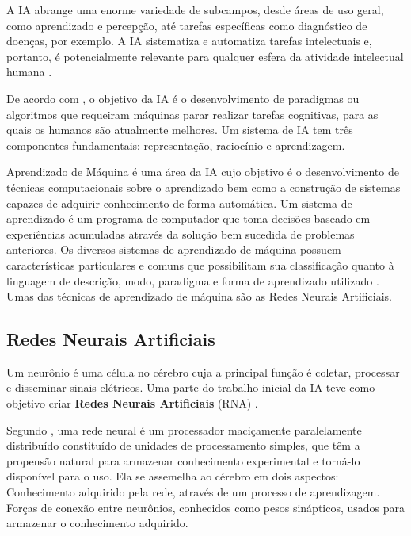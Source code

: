 \documentclass[
	12pt,				%
	openright,			%
	oneside,
	a4paper,			%
	english,			%
	french,				%
	spanish,			%
	brazil,				%
	]{abntex2}
\begin{document}
A IA abrange uma enorme variedade de subcampos, desde áreas de uso geral, como aprendizado e percepção, até tarefas específicas como diagnóstico de doenças, por exemplo. A IA sistematiza e automatiza tarefas intelectuais e, portanto, é potencialmente relevante para qualquer esfera da atividade intelectual humana \cite{russell2004inteligencia}.

De acordo com , o objetivo da IA é o desenvolvimento de paradigmas ou algoritmos que requeiram máquinas parar realizar tarefas cognitivas, para as quais os humanos são atualmente melhores. Um sistema de IA tem três componentes fundamentais: representação, raciocínio e aprendizagem.

Aprendizado de Máquina é uma área da IA cujo objetivo é o desenvolvimento de técnicas computacionais sobre o aprendizado bem como a construção de sistemas capazes de adquirir conhecimento de forma automática. Um sistema de aprendizado é um programa de computador que toma decisões baseado em experiências acumuladas através da solução bem sucedida de problemas anteriores. Os diversos sistemas de aprendizado de máquina possuem características particulares e comuns que possibilitam sua classificação quanto à linguagem de descrição, modo, paradigma e forma de aprendizado utilizado \cite{monard2003sistemas}.
Umas das técnicas de aprendizado de máquina são as Redes Neurais Artificiais.


\subsection{Redes Neurais Artificiais}
\label{sec:RNA}
Um neurônio é uma célula no cérebro cuja a principal função é coletar, processar e disseminar sinais elétricos. Uma parte do trabalho inicial da IA teve como objetivo criar \textbf{Redes Neurais Artificiais} (RNA) \cite{russell2004inteligencia}.

Segundo , uma rede neural é um processador maciçamente paralelamente distribuído constituído de unidades de processamento simples, que têm a propensão natural para armazenar conhecimento experimental e torná-lo disponível para o uso. Ela se assemelha ao cérebro em dois aspectos: Conhecimento adquirido pela rede, através de um processo de aprendizagem. Forças de conexão entre neurônios, conhecidos como pesos sinápticos, usados para armazenar o conhecimento adquirido.
\end{document}
